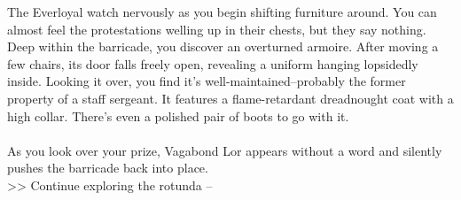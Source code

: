 The Everloyal watch nervously as you begin shifting furniture around. You can almost feel the protestations welling up in their chests, but they say nothing.\\

Deep within the barricade, you discover an overturned armoire. After moving a few chairs, its door falls freely open, revealing a uniform hanging lopsidedly inside. Looking it over, you find it's well-maintained--probably the former property of a staff sergeant. It features a flame-retardant dreadnought coat with a high collar. There's even a polished pair of boots to go with it.\\
\\

As you look over your prize, Vagabond Lor appears without a word and silently pushes the barricade back into place.\\

>> Continue exploring the rotunda -- 